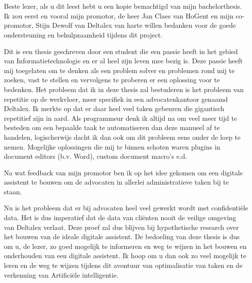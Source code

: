 
\chapter*{}%
\label{ch:voorwoord}


Beste lezer, als u dit leest hebt u een kopie bemachtigd van mijn bachelorthesis. 
Ik zou eerst en vooral mijn promotor, de heer Jan Claes van HoGent en mijn co-promotor, Stijn Dewolf van Deltalex van harte willen bedanken voor de goede ondersteuning en behulpzaamheid tijdens dit project. 


Dit is een thesis geschreven door een student die een passie heeft in het gebied van Informatietechnologie en er al heel zijn leven mee bezig is. 
Deze passie heeft mij toegelaten om te denken als een problem solver en problemen rond mij te zoeken, vast te stellen en vervolgens te proberen er een oplossing voor te bedenken. 
Het probleem dat ik in deze thesis zal bestuderen is het probleem van repetitie op de werkvloer, meer specifiek in een advocatenkantoor genaamd Deltalex. 
Ik merkte op dat er daar heel veel taken gebeuren die gigantisch repetitief zijn in aard. 
Als programmeur denk ik altijd na om veel meer tijd te besteden om een bepaalde taak te automatiseren dan deze manueel af te handelen, logischerwijs dacht ik dan ook om dit probleem eens onder de loep te nemen. 
Mogelijke oplossingen die mij te binnen schoten waren plugins in document editors (b.v. Word), custom document macro's e.d. 

Na wat feedback van mijn promotor ben ik op het idee gekomen om een digitale assistent te bouwen om de advocaten in allerlei administratieve taken bij te staan. 

Nu is het probleem dat er bij advocaten heel veel gewerkt wordt met confidentiële data. 
Het is dus imperatief dat de data van cliënten nooit de veilige omgeving van Deltalex verlaat. 
Deze proef zal dus blijven bij hypothetische research over het bouwen van de ideale digitale assistent. 
De bedoeling van deze thesis is dus om u, de lezer, zo goed mogelijk te informeren en weg te wijzen in het bouwen en onderhouden van een digitale assistent. 
Ik hoop om u dan ook zo veel mogelijk te leren en de weg te wijzen tijdens dit avontuur van optimalisatie van taken en de verkenning van Artificiële intelligentie. 
